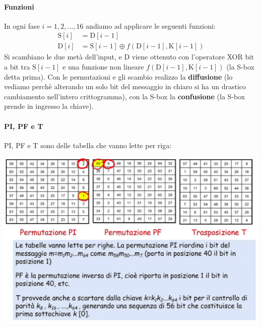 \paragraph{Funzioni} In ogni fase $i=1,2,\dots,16$ andiamo ad applicare le seguenti funzioni:
\begin{align*}
	\text{S}[i] &= \text{D}[i-1]\\
	\text{D}[i] &= \text{S}[i-1] \oplus f\left(\text{D}[i-1],\text{K}[i-1]\right)
\end{align*}
Si scambiano le due metà dell'input, e D viene ottenuto con l'operatore XOR bit a bit tra $\text{S}[i-1]$ e una funzione non lineare $f\left(\text{D}[i-1],\text{K}[i-1]\right)$ (la S-box detta prima). Con le permutazioni e gli scambio realizzo la \textbf{diffusione} (lo vediamo perchè alterando un solo bit del messaggio in chiaro si ha un drastico cambiamento nell'intero crittogramma), con la S-box la \textbf{confusione} (la S-box prende in ingresso la chiave).

\paragraph{PI, PF e T} PI, PF e T sono delle tabella che vanno lette per riga:
\begin{center}
	\includegraphics[scale=.5]{images/17.PNG}
\end{center}

